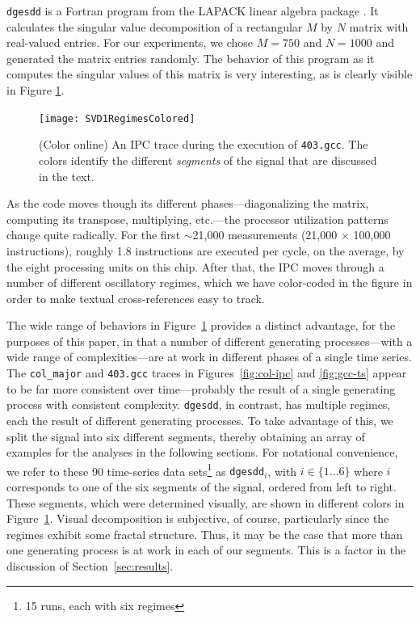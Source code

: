 \documentclass[%
pre,
reprint,
superscriptaddress,
showpacs,
nofootinbib,
nobibnotes,
 amsmath,amssymb,
 aps,
]{revtex4-1}
\newcommand{\gcc}{{\tt 403.gcc}\xspace}
\newcommand{\svd}{{\tt dgesdd}\xspace}
\newcommand{\col}{{\tt col\_major}\xspace}
\begin{document}
\svd is a Fortran program from the LAPACK linear algebra package
\cite{lapack}.  It calculates the singular value decomposition of a
rectangular $M$ by $N$ matrix with real-valued entries.  For our
experiments, we chose $M=750$ and $N=1000$ and generated the matrix
entries randomly.
% 
% 
The behavior of this program as it computes the singular values of
this matrix is very interesting, as is clearly visible in Figure
\ref{fig:svd-ts-colored}.  
\begin{figure}[t]
    \centering
    \texttt{[image: SVD1RegimesColored]}
    \caption{(Color online) An IPC trace during the execution of \gcc.  The colors
      identify the different \emph{segments} of the signal that are
      discussed in the text.}
    \label{fig:svd-ts-colored}
  \end{figure}
As the code moves though its different phases---diagonalizing the
matrix, computing its transpose, multiplying, etc.---the processor
utilization patterns change quite radically.  For the first
$\sim$21,000 measurements (21,000 $\times$ 100,000 instructions),
roughly 1.8 instructions are executed per cycle, on the average, by
the eight processing units on this chip.  After that, the IPC moves
through a number of different oscillatory regimes, which we have
color-coded in the figure in order to make textual cross-references
easy to track.

The wide range of behaviors in Figure~\ref{fig:svd-ts-colored}
provides a distinct advantage, for the purposes of this paper, in that
a number of different generating processes---with a wide range of
complexities---are at work in different phases of a single time
series.  The \col and \gcc traces in Figures~\ref{fig:col-ipc} and
\ref{fig:gcc-ts} appear to be far more consistent over time---probably
the result of a single generating process with consistent complexity.
\svd, in contrast, has multiple regimes, each the result of different
generating processes.  To take advantage of this, we split the signal
into six different segments, thereby obtaining an array of examples
for the analyses in the following sections.  For notational
convenience, we refer to these 90 time-series data sets\footnote{15
  runs, each with six regimes} as {\tt dgesdd$_i$}, with $i \in
\{1\dots6\}$ where $i$ corresponds to one of the six segments of the
signal, ordered from left to right.  These segments, which were
determined visually, are shown in different colors in
Figure~\ref{fig:svd-ts-colored}.  Visual decomposition is subjective,
of course, particularly since the regimes exhibit some fractal
structure.  Thus, it may be the case that more than one generating
process is at work in each of our segments.  This is a factor in the
discussion of Section~\ref{sec:results}.
\end{document}
